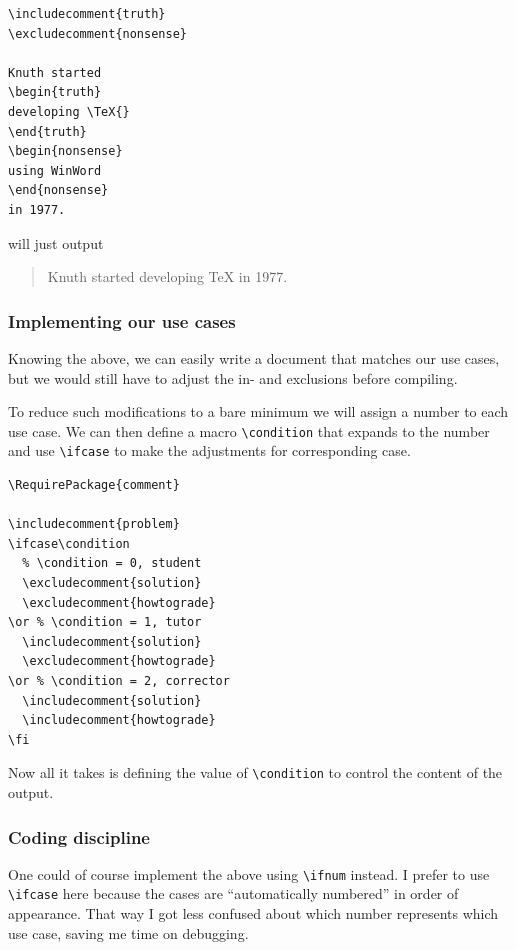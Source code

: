 \documentclass{maps}
\begin{document}
\begin{lstlisting}[language={[LaTeX]TeX}, style=arn:lst]
\includecomment{truth}
\excludecomment{nonsense}

Knuth started
\begin{truth}
developing \TeX{}
\end{truth}
\begin{nonsense}
using WinWord
\end{nonsense}
in 1977.
\end{lstlisting}

\noindent will just output

\begin{quotation}
\noindent Knuth started developing \TeX{} in 1977.
\end{quotation}

\subsubsection{Implementing our use cases}

Knowing the above, we can easily write a document that matches our use cases, but we would still have to adjust the in- and exclusions before compiling.

To reduce such modifications to a bare minimum we will assign a number to each use case. We can then define a macro \verb+\condition+ that expands to the number and use \verb+\ifcase+ to make the adjustments for corresponding case.

\begin{lstlisting}[language={[LaTeX]TeX}, style=arn:lst, caption={Use case implementation}, label=arn:useifcase]
\RequirePackage{comment}

\includecomment{problem}
\ifcase\condition
  % \condition = 0, student
  \excludecomment{solution}
  \excludecomment{howtograde}
\or % \condition = 1, tutor
  \includecomment{solution}
  \excludecomment{howtograde}
\or % \condition = 2, corrector
  \includecomment{solution}
  \includecomment{howtograde}
\fi
\end{lstlisting}

Now all it takes is defining the value of \verb+\condition+ to control the content of the output.

\subsubsection{Coding discipline}
One could of course implement the above using \verb+\ifnum+ instead. I prefer to use \verb+\ifcase+ here because the cases are \enquote{automatically numbered} in order of appearance. That way I got less confused about which number represents which use case, saving me time on debugging.
\end{document}
